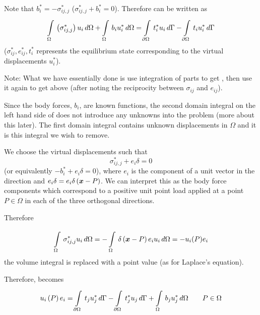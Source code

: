 Note that $b_{i}^{*} = -\sigma_{ij,j} ^{*}$  (\ie $\sigma_{ij,j} ^{*} +
b_{i}^{*} =  0$). Therefore  can be written as
\begin{equation}
     \displaystyle\int\limits_{\Omega}^{} \,\left( \sigma_{ij,j} ^{*} \right) u_{i}\,d\Omega   + 
     \displaystyle\int\limits_{\Omega}^{} \,b_{i} u_{i}^{*}\,d\Omega   = 
    \displaystyle\int\limits_{\partial \Omega}^{} \,t_{i}^{*} u_{i}\,d\Gamma  - 
    \displaystyle\int\limits_{\partial \Omega}^{} \,t_{i} u_{i}^{*}\,d\Gamma 
  \label{eqn:eqnD}
\end{equation}
($\sigma_{ij} ^{*},e_{ij}^{*},t_{i}^{*}$ represents the equilibrium state
corresponding to the virtual displacements $u_{i}^{*}$).

Note: What we have essentially done is use integration of parts to get
, then use it again to get  above (after
noting the reciprocity between $\sigma_{ij}$ and $e_{ij}$).

Since the body forces, $b_{i}$, are known functions, the second domain
integral on the left hand side of  does not introduce any
unknowns into the problem (more about this later). The first domain integral
contains unknown displacements in $\Omega$ and it is this integral we wish to
remove.
 
We choose the virtual displacements such that
\begin{equation}
  \sigma_{ij,j}^{*} + e_{i} \delta = 0 
  \label{eqn:FundSol}
\end{equation}
(or equivalently $- b_{i}^{*} + e_{i} \delta = 0$), where $e_{i}$ is the 
component of a unit vector in the  direction and $e_{i}\delta =
e_{i}\fnof{\delta}{\vect{x} - P}$. We can interpret this as the body force
components which correspond to a positive unit point load applied at a point
$P \in \Omega$ in each of the three orthogonal directions.

Therefore

\begin{displaymath}
  \gint{\Omega}{}{\sigma_{ij,j}^{*} u_{i}}{\Omega} = -
  \gint{\Omega}{}{\fnof{\delta}{\vect{x} - P} e_{i} u_{i}}{\Omega} = - u_{i}(P)e_{i}
\end{displaymath}
\ie the volume integral is replaced with a point value (as for Laplace's 
equation).

Therefore,  becomes
\begin{equation}
   u_{i}\left( P \right) e_{i}  =   \displaystyle\int\limits_{\partial \Omega}^{} \,t_{j} u_{j}^{*}\,d\Gamma   -  
    \displaystyle\int\limits_{\partial \Omega}^{} \,t_{j}^{*} u_{j}\,d\Gamma  + 
     \displaystyle\int\limits_{\Omega}^{} \,b_{j} u_{j}^{*}\,d\Omega   \qquad P \in \Omega
  \label{eqn:eqnE}
\end{equation}

